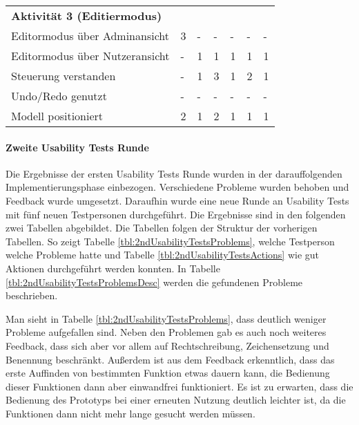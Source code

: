 \begin{table}[H]
\begin{tabular}{l||llllll}
        \textbf{Aktivität 3 (Editiermodus)} &           &           &           &           &           &           \\
        Editormodus über Adminansicht       &         3 &         - &         - &         - &         - &         - \\
        Editormodus über Nutzeransicht      &         - &         1 &         1 &         1 &         1 &         1 \\
        Steuerung verstanden                &         - &         1 &         3 &         1 &         2 &         1 \\
        Undo/Redo genutzt                   &         - &         - &         - &         - &         - &         - \\
        Modell positioniert                 &         2 &         1 &         2 &         1 &         1 &         1 \\
    \end{tabular}
\end{table}


\paragraph{Zweite Usability Tests Runde}

Die Ergebnisse der ersten Usability Tests Runde wurden in der darauffolgenden Implementierungsphase einbezogen. Verschiedene Probleme wurden behoben und Feedback wurde umgesetzt. Daraufhin wurde eine neue Runde an Usability Tests mit fünf neuen Testpersonen durchgeführt. Die Ergebnisse sind in den folgenden zwei Tabellen abgebildet. Die Tabellen folgen der Struktur der vorherigen Tabellen. So zeigt Tabelle \ref{tbl:2ndUsabilityTestsProblems}, welche Testperson welche Probleme hatte und Tabelle \ref{tbl:2ndUsabilityTestsActions} wie gut Aktionen durchgeführt werden konnten. In Tabelle \ref{tbl:2ndUsabilityTestsProblemsDesc} werden die gefundenen Probleme beschrieben. 

Man sieht in Tabelle \ref{tbl:2ndUsabilityTestsProblems}, dass deutlich weniger Probleme aufgefallen sind. Neben den Problemen gab es auch noch weiteres Feedback, dass sich aber vor allem auf Rechtschreibung, Zeichensetzung und Benennung beschränkt. Außerdem ist aus dem Feedback erkenntlich, dass das erste Auffinden von bestimmten Funktion etwas dauern kann, die Bedienung dieser Funktionen dann aber einwandfrei funktioniert. Es ist zu erwarten, dass die Bedienung des Prototyps bei einer erneuten Nutzung deutlich leichter ist, da die Funktionen dann nicht mehr lange gesucht werden müssen.

